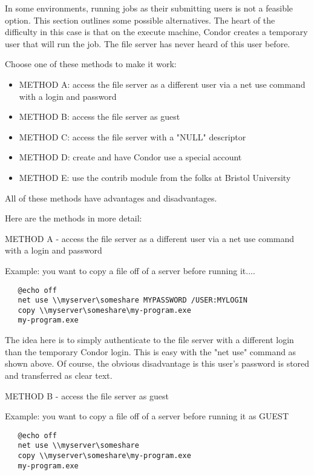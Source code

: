 In some environments, running jobs as their submitting users is not a
feasible option.  This section outlines some possible
alternatives. The heart of the difficulty in this case is that on the
execute machine, Condor creates a temporary user that will run the
job.  The file server has never heard of this user before.

Choose one of these methods to make it work:

\begin{itemize}
\item METHOD A: access the file server as a different user via a net use command
with a login and password
\item METHOD B: access the file server as guest
\item METHOD C: access the file server with a "NULL" descriptor
\item METHOD D: create and have Condor use a special account 
\item METHOD E: use the contrib module from the folks at Bristol University
\end{itemize}

All of these methods have advantages and disadvantages.

Here are the methods in more detail:

METHOD A - access the file server as a different user via a net use command 
with a login and password

Example: you want to copy a file off of a server before running it....

\footnotesize
\begin{verbatim}
   @echo off
   net use \\myserver\someshare MYPASSWORD /USER:MYLOGIN
   copy \\myserver\someshare\my-program.exe
   my-program.exe
\end{verbatim}
\normalsize

The idea here is to simply authenticate to the file server with a different 
login than the temporary Condor login.  This is easy with the "net use" 
command as shown above.  Of course, the obvious disadvantage is this user's 
password is stored and transferred as clear text.

METHOD B - access the file server as guest

Example: you want to copy a file off of a server before running it as GUEST

\begin{verbatim}
   @echo off
   net use \\myserver\someshare
   copy \\myserver\someshare\my-program.exe
   my-program.exe
\end{verbatim}

